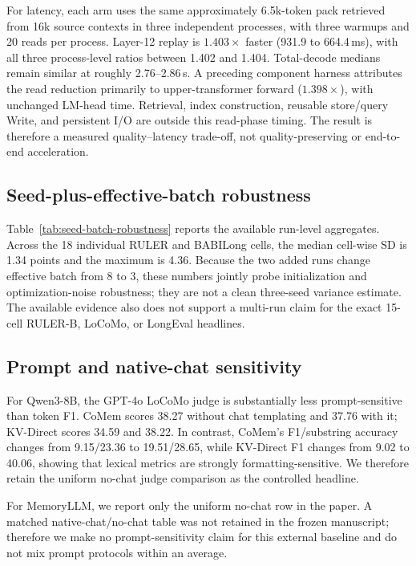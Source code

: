 For latency, each arm uses the same approximately 6.5k-token pack retrieved from
16k source contexts in three independent
processes, with three warmups and 20 reads per process. Layer-12 replay is
$1.403\times$ faster (931.9 to 664.4\,ms), with all three process-level ratios
between 1.402 and 1.404. Total-decode medians remain similar at roughly
2.76--2.86\,s. A preceding component harness attributes the read reduction
primarily to upper-transformer forward ($1.398\times$), with unchanged LM-head
time. Retrieval, index construction, reusable store/query Write, and persistent
I/O are outside this read-phase timing. The result is therefore a measured
quality--latency trade-off, not quality-preserving or end-to-end acceleration.




\FloatBarrier

\subsection{Seed-plus-effective-batch robustness}

Table~\ref{tab:seed-batch-robustness} reports the available run-level
aggregates. Across the 18 individual RULER and BABILong cells, the median
cell-wise SD is 1.34 points and the maximum is 4.36. Because the two added runs
change effective batch from 8 to 3, these numbers jointly probe initialization
and optimization-noise robustness; they are not a clean three-seed variance
estimate. The available evidence also does not support a multi-run claim for the
exact 15-cell RULER-B, LoCoMo, or LongEval headlines.

\subsection{Prompt and native-chat sensitivity}

For Qwen3-8B, the GPT-4o LoCoMo judge is substantially less prompt-sensitive
than token F1. CoMem scores 38.27 without chat templating and 37.76 with it;
KV-Direct scores 34.59 and 38.22. In contrast, CoMem's F1/substring accuracy
changes from 9.15/23.36 to 19.51/28.65, while KV-Direct F1 changes from 9.02 to
40.06, showing that lexical metrics are strongly formatting-sensitive. We therefore retain the uniform
no-chat judge comparison as the controlled headline.

For MemoryLLM, we report only the uniform no-chat row in the paper. A matched
native-chat/no-chat table was not retained in the frozen manuscript; therefore
we make no prompt-sensitivity claim for this external baseline and do not mix
prompt protocols within an average.

